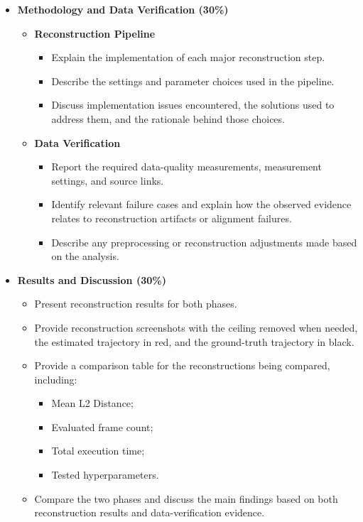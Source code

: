 \documentclass[11pt]{article}
\begin{document}
\begin{itemize}

    \item \textbf{Methodology and Data Verification (30\%)}
    \begin{itemize}

        \item \textbf{Reconstruction Pipeline}
        \begin{itemize}
            \item Explain the implementation of each major reconstruction step.
            \item Describe the settings and parameter choices used in the pipeline.
            \item Discuss implementation issues encountered, the solutions used
            to address them, and the rationale behind those choices.
        \end{itemize}

        \item \textbf{Data Verification}
        \begin{itemize}
            \item Report the required data-quality measurements, measurement
            settings, and source links.
            \item Identify relevant failure cases and explain how the observed
            evidence relates to reconstruction artifacts or alignment failures.
            \item Describe any preprocessing or reconstruction adjustments made
            based on the analysis.
        \end{itemize}

    \end{itemize}

    \item \textbf{Results and Discussion (30\%)}
    \begin{itemize}
        \item Present reconstruction results for both phases.
        \item Provide reconstruction screenshots with the ceiling removed when
        needed, the estimated trajectory in red, and the ground-truth trajectory
        in black.
        \item Provide a comparison table for the reconstructions being compared,
        including:
        \begin{itemize}
            \item Mean L2 Distance;
            \item Evaluated frame count;
            \item Total execution time;
            \item Tested hyperparameters.
        \end{itemize}
        \item Compare the two phases and discuss the main findings based on both
        reconstruction results and data-verification evidence.
    \end{itemize}


\end{itemize}
\end{document}
